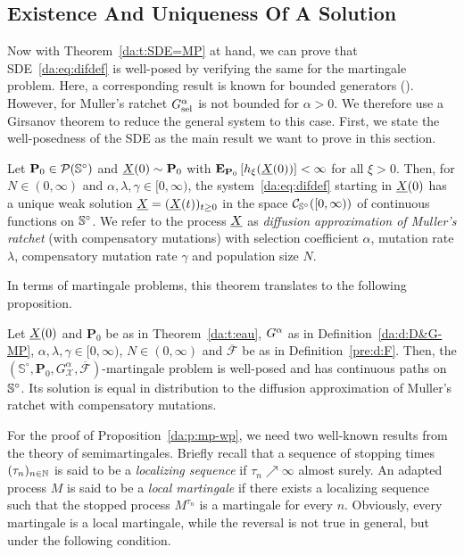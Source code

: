 \subsection{Existence And Uniqueness Of A Solution}

Now with Theorem~\ref{da:t:SDE=MP} at hand, we can prove that SDE~\eqref{da:eq:difdef} is well-posed
by verifying the same for the martingale problem. Here, a corresponding result
is known for bounded generators (\cite{hennequin_measure-valued_1993}). However, for Muller's ratchet $G^{\alpha}_{\text{sel}}$ is not
bounded for $\alpha > 0$. We therefore use a Girsanov theorem to reduce the general system to this
case. First, we state the well-posedness of the SDE as the main result we want to prove in this
section.

\begin{Theorem}
\label{da:t:eau}
Let  $\mathbf{P}_0 \in \mathcal{P}(\mathbb{S}^\circ)$ and $\underline{X} \! \left( 0 \right) \sim \mathbf{P}_0$ with
$\mathbf{E}_{\mathbf{P}_0}\left[ h_\xi(\underline{X} \! \left( 0 \right)) \right] < \infty$ for all $\xi >0$. 
Then, for $N\in (0,\infty)$ and $\alpha,\lambda,\gamma\in [0,\infty)$, the
system~\eqref{da:eq:difdef} starting in $\underline{X} \! \left( 0 \right)$ has a unique weak solution $\underline{X} = (\underline{X} \! \left( t \right))_{t\geq 0}$ in the space
$\mathcal C_{\mathbb{S}^\circ}([0,\infty))$ of continuous functions on $\mathbb{S}^\circ$. We refer to the
process $\underline{X}$ as \emph{diffusion approximation of Muller's ratchet} (with
compensatory mutations) with selection coefficient $\alpha$, mutation rate
$\lambda$, compensatory mutation rate $\gamma$ and population size $N$.
\end{Theorem}

\noindent 
In terms of martingale problems, this theorem translates to the following proposition.

\begin{Proposition}
\label{da:p:mp-wp}
Let $\underline{X} \! \left( 0 \right)$ and $\mathbf{P}_0$ be as in Theorem~\ref{da:t:eau}, $G^{\alpha}$ as in
Definition~\ref{da:d:D&G-MP}, $\alpha, \lambda, \gamma\in [0,\infty)$, $N\in (0,\infty)$ and
$\overline{\mathcal F}$ be as in Definition~\ref{pre:d:F}. Then, the $(\mathbb S^\circ,\mathbf P_0,
G_{\mathcal X}^\alpha, \overline{\mathcal F})$-martingale problem is well-posed and has continuous
paths on $\mathbb{S}^\circ$. Its solution is equal in distribution to the diffusion approximation of
Muller's ratchet with compensatory mutations.
\end{Proposition}

\noindent
For the proof of Proposition~\ref{da:p:mp-wp}, we need two well-known results from the theory of
semimartingales. Briefly recall that a sequence of stopping times $(\tau_n)_{n \in \mathbb{N}}$ is said
to be a \emph{localizing sequence} if $\tau_n \nearrow \infty$ almost
surely. An adapted process $M$ is said to be a \emph{local martingale} if there
exists a localizing sequence such that the stopped process $M^{\tau_n}$ is a
martingale for every $n$. Obviously, every martingale is a local martingale,
while the reversal is not true in general, but under the following condition.

